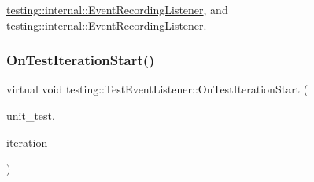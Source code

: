\mbox{\hyperlink{classtesting_1_1internal_1_1_event_recording_listener_a48f6f53c044e8cb6425f9bc7319ddecc}{testing\+::internal\+::\+Event\+Recording\+Listener}}, and \mbox{\hyperlink{classtesting_1_1internal_1_1_event_recording_listener_ab0cc007bcfaf06cd383d574c88f62aea}{testing\+::internal\+::\+Event\+Recording\+Listener}}.

\mbox{\label{classtesting_1_1_test_event_listener_a60cc09b7907cb329d152eb5e7133bdeb}} 
\subsubsection{\texorpdfstring{OnTestIterationStart()}{OnTestIterationStart()}\hspace{0.1cm}{\footnotesize\ttfamily [1/3]}}
{\footnotesize\ttfamily virtual void testing\+::\+Test\+Event\+Listener\+::\+On\+Test\+Iteration\+Start (\begin{DoxyParamCaption}\item[{const \mbox{\hyperlink{classtesting_1_1_unit_test}{Unit\+Test}} \&}]{unit\+\_\+test,  }\item[{int}]{iteration }\end{DoxyParamCaption})\hspace{0.3cm}{\ttfamily [pure virtual]}}



